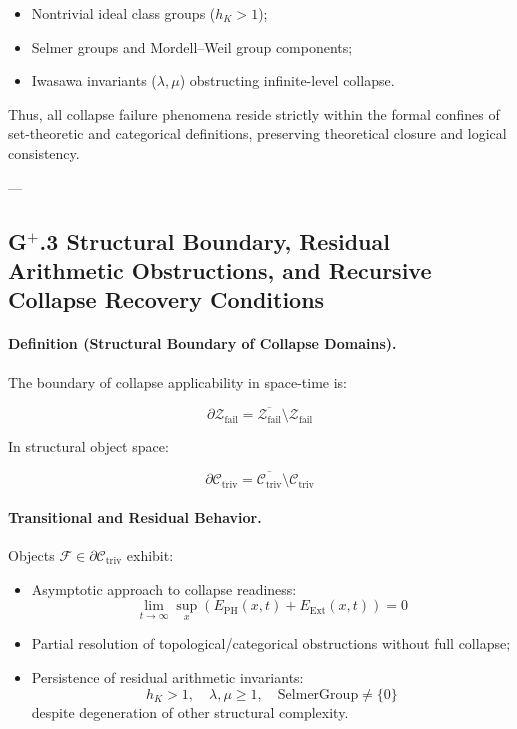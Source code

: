 \documentclass[11pt]{article}
\begin{document}
\begin{itemize}
    \item Nontrivial ideal class groups ($h_K > 1$);
    \item Selmer groups and Mordell–Weil group components;
    \item Iwasawa invariants ($\lambda, \mu$) obstructing infinite-level collapse.
\end{itemize}

Thus, all collapse failure phenomena reside strictly within the formal confines of set-theoretic and categorical definitions, preserving theoretical closure and logical consistency.

---

\subsection*{G$^{+}$.3 Structural Boundary, Residual Arithmetic Obstructions, and Recursive Collapse Recovery Conditions}

\paragraph{Definition (Structural Boundary of Collapse Domains).}

The boundary of collapse applicability in space-time is:

\[
\partial \mathcal{Z}_{\mathrm{fail}} = \overline{\mathcal{Z}_{\mathrm{fail}}} \setminus \mathcal{Z}_{\mathrm{fail}}
\]

In structural object space:

\[
\partial \mathcal{C}_{\mathrm{triv}} = \overline{\mathcal{C}_{\mathrm{triv}}} \setminus \mathcal{C}_{\mathrm{triv}}
\]

\paragraph{Transitional and Residual Behavior.}

Objects $\mathcal{F} \in \partial \mathcal{C}_{\mathrm{triv}}$ exhibit:

\begin{itemize}
    \item Asymptotic approach to collapse readiness:
    \[
    \lim_{t \to \infty} \sup_{x} \left( E_{\mathrm{PH}}(x,t) + E_{\mathrm{Ext}}(x,t) \right) = 0
    \]
    \item Partial resolution of topological/categorical obstructions without full collapse;
    \item Persistence of residual arithmetic invariants:
    \[
    h_K > 1, \quad \lambda, \mu \geq 1, \quad \mathrm{SelmerGroup} \neq \{0\}
    \]
    despite degeneration of other structural complexity.
\end{itemize}
\end{document}
